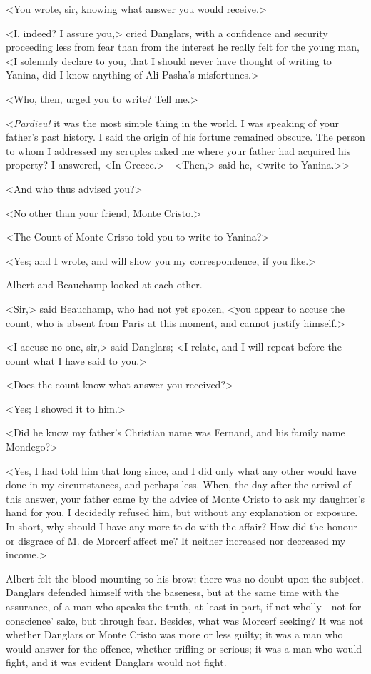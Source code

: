  <You wrote, sir, knowing what answer you would receive.> 

 <I, indeed? I assure you,> cried Danglars, with a confidence and security proceeding less from fear than from the interest he really felt for the young man, <I solemnly declare to you, that I should never have thought of writing to Yanina, did I know anything of Ali Pasha's misfortunes.> 

 <Who, then, urged you to write? Tell me.> 

 <\textit{Pardieu!} it was the most simple thing in the world. I was speaking of your father's past history. I said the origin of his fortune remained obscure. The person to whom I addressed my scruples asked me where your father had acquired his property? I answered, <In Greece.>—<Then,> said he, <write to Yanina.>> 

 <And who thus advised you?> 

 <No other than your friend, Monte Cristo.> 

 <The Count of Monte Cristo told you to write to Yanina?> 

 <Yes; and I wrote, and will show you my correspondence, if you like.> 

 Albert and Beauchamp looked at each other. 

 <Sir,> said Beauchamp, who had not yet spoken, <you appear to accuse the count, who is absent from Paris at this moment, and cannot justify himself.> 

 <I accuse no one, sir,> said Danglars; <I relate, and I will repeat before the count what I have said to you.> 

 <Does the count know what answer you received?> 

 <Yes; I showed it to him.> 

 <Did he know my father's Christian name was Fernand, and his family name Mondego?> 

 <Yes, I had told him that long since, and I did only what any other would have done in my circumstances, and perhaps less. When, the day after the arrival of this answer, your father came by the advice of Monte Cristo to ask my daughter's hand for you, I decidedly refused him, but without any explanation or exposure. In short, why should I have any more to do with the affair? How did the honour or disgrace of M. de Morcerf affect me? It neither increased nor decreased my income.> 

 Albert felt the blood mounting to his brow; there was no doubt upon the subject. Danglars defended himself with the baseness, but at the same time with the assurance, of a man who speaks the truth, at least in part, if not wholly—not for conscience' sake, but through fear. Besides, what was Morcerf seeking? It was not whether Danglars or Monte Cristo was more or less guilty; it was a man who would answer for the offence, whether trifling or serious; it was a man who would fight, and it was evident Danglars would not fight. 

